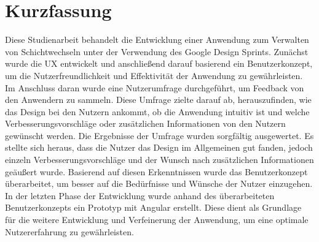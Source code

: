 \section*{Kurzfassung}
Diese Studienarbeit behandelt die Entwicklung einer Anwendung zum Verwalten von Schichtwechseln unter der Verwendung des Google Design Sprints. Zunächst wurde die UX entwickelt und anschließend darauf basierend ein Benutzerkonzept, um die Nutzerfreundlichkeit und Effektivität der Anwendung zu gewährleisten. Im Anschluss daran wurde eine Nutzerumfrage durchgeführt, um Feedback von den Anwendern zu sammeln. Diese Umfrage zielte darauf ab, herauszufinden, wie das Design bei den Nutzern ankommt, ob die Anwendung intuitiv ist und welche Verbesserungsvorschläge oder zusätzlichen Informationen von den Nutzern gewünscht werden. Die Ergebnisse der Umfrage wurden sorgfältig ausgewertet. Es stellte sich heraus, dass die Nutzer das Design im Allgemeinen gut fanden, jedoch einzeln Verbesserungsvorschläge und der Wunsch nach zusätzlichen Informationen geäußert wurde. Basierend auf diesen Erkenntnissen wurde das Benutzerkonzept überarbeitet, um besser auf die Bedürfnisse und Wünsche der Nutzer einzugehen. In der letzten Phase der Entwicklung wurde anhand des überarbeiteten Benutzerkonzepts ein Prototyp mit Angular erstellt. Diese dient als Grundlage für die weitere Entwicklung und Verfeinerung der Anwendung, um eine optimale Nutzererfahrung zu gewährleisten.
